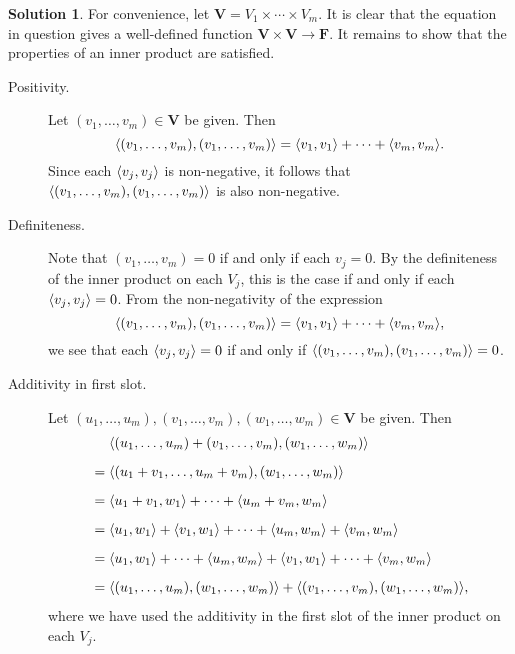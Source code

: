 \documentclass[12pt]{article}
\theoremstyle{definition}
\theoremstyle{exercise}
\theoremstyle{solution}
\newtheorem*{solution}{Solution}
\newcommand{\F}{\mathbf{F}}
\DeclarePairedDelimiter\ip{\langle}{\rangle}
\begin{document}
\begin{solution}
    For convenience, let \( \mathbf{V} = V_1 \times \cdots \times V_m \). It is clear that the equation in question gives a well-defined function \( \mathbf{V} \times \mathbf{V} \to \F \). It remains to show that the properties of an inner product are satisfied.
    \begin{description}
        \item[Positivity.] Let \( (v_1, \ldots, v_m) \in \mathbf{V} \) be given. Then
        \[
            \ip{(v_1, \ldots, v_m), (v_1, \ldots, v_m)} = \ip{v_1, v_1} + \cdots + \ip{v_m, v_m}.
        \]
        Since each \( \ip{v_j, v_j} \) is non-negative, it follows that \( \ip{(v_1, \ldots, v_m), (v_1, \ldots, v_m)} \) is also non-negative.

        \item[Definiteness.] Note that \( (v_1, \ldots, v_m) = 0 \) if and only if each \( v_j = 0 \). By the definiteness of the inner product on each \( V_j \), this is the case if and only if each \( \ip{v_j, v_j} = 0 \). From the non-negativity of the expression
        \[
            \ip{(v_1, \ldots, v_m), (v_1, \ldots, v_m)} = \ip{v_1, v_1} + \cdots + \ip{v_m, v_m},
        \]
        we see that each \( \ip{v_j, v_j} = 0 \) if and only if \( \ip{(v_1, \ldots, v_m), (v_1, \ldots, v_m)} = 0 \).

        \item[Additivity in first slot.] Let \( (u_1, \ldots, u_m), (v_1, \ldots, v_m), (w_1, \ldots, w_m) \in \mathbf{V} \) be given. Then
        \begin{align*}
            & \quad\,\, \ip{(u_1, \ldots, u_m) + (v_1, \ldots, v_m), (w_1, \ldots, w_m)} \\[2mm]
            &= \ip{(u_1 + v_1, \ldots, u_m + v_m), (w_1, \ldots, w_m)} \\[2mm]
            &= \ip{u_1 + v_1, w_1} + \cdots + \ip{u_m + v_m, w_m} \\[2mm]
            &= \ip{u_1, w_1} + \ip{v_1, w_1} + \cdots + \ip{u_m, w_m} + \ip{v_m, w_m} \\[2mm]
            &= \ip{u_1, w_1} + \cdots + \ip{u_m, w_m} + \ip{v_1, w_1} + \cdots + \ip{v_m, w_m} \\[2mm]
            &= \ip{(u_1, \ldots, u_m), (w_1, \ldots, w_m)} + \ip{(v_1, \ldots, v_m), (w_1, \ldots, w_m)},
        \end{align*}
        where we have used the additivity in the first slot of the inner product on each \( V_j \).


\end{description}
\end{solution}
\end{document}
